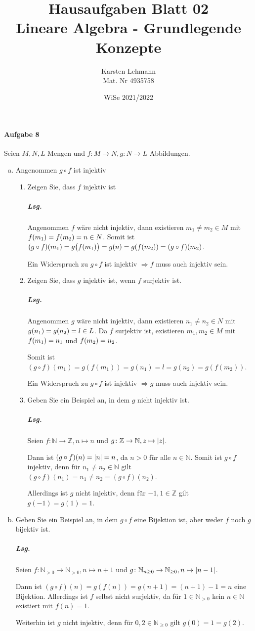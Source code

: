 \documentclass{scrreprt}
\author{Karsten Lehmann\\Mat. Nr 4935758}
\date{WiSe 2021/2022}
\title{Hausaufgaben Blatt 02\\Lineare Algebra - Grundlegende Konzepte}
\begin{document}
\paragraph{Aufgabe 8} Seien $M, N, L$ Mengen und
$f \colon M \to N, g \colon N \to L$ Abbildungen.
\begin{enumerate}[(a)]
\item Angenommen $g \circ f$ ist injektiv
  \begin{enumerate}[label={(a\arabic*)}]
  \item Zeigen Sie, dass $f$ injektiv ist

    \subparagraph{Lsg.} Angenommen $f$ wäre nicht injektiv,
    dann existieren $m_1 \ne m_2 \in M$ mit $f\qty(m_1) = f\qty(m_2) = n \in N$.
    Somit ist
    $(g \circ f)\qty(m_1) = g\qty\big(f(m_1)) = g(n) = g\qty(f(m_2))
    = (g \circ f)(m_2)$.

    Ein Widerspruch zu $g \circ f$ ist injektiv $\Rightarrow f$ muss auch injektiv sein.
  \item Zeigen Sie, dass $g$ injektiv ist, wenn $f$ surjektiv ist.

    \subparagraph{Lsg.} Angenommen $g$ wäre nicht injektiv,
    dann existieren $n_1 \ne n_2 \in N$ mit $g\qty(n_1) = g\qty(n_2) = l \in L$.
    Da $f$ surjektiv ist, existieren $m_1, m_2 \in M$ mit $f\qty(m_1) = n_1$
    und $f\qty(m_2) = n_2$.

    Somit ist
    $(g \circ f)(m_1) = g(f(m_1)) = g(n_1) = l = g(n_2) = g(f(m_2))$.

    Ein Widerspruch zu $g \circ f$ ist injektiv $\Rightarrow g$ muss auch injektiv sein.

  \item Geben Sie ein Beispiel an, in dem $g$ nicht injektiv ist.

    \subparagraph{Lsg.} Seien $f \colon \mathbb{N} \to \mathbb{Z}, n \mapsto n$
    und $g \colon \mathbb{Z} \to \mathbb{N}, z \mapsto \abs{z}$.

    Dann ist $(g \circ f)(n) = \abs{n} = n$, da $n > 0$ für alle $n \in \mathbb{N}$.
    Somit ist $g \circ f$ injektiv, denn für $n_1 \ne n_2 \in \mathbb{N}$ gilt
    $(g \circ f)(n_1) = n_1 \ne n_2 = (g \circ f)(n_2)$.

    Allerdings ist $g$ nicht injektiv, denn für $-1, 1 \in \mathbb{Z}$ gilt
    $g(-1) = g(1) = 1$.
  \end{enumerate}

\setcounter{enumi}{2}
\item Geben Sie ein Beispiel an, in dem $g \circ f$ eine Bijektion ist, aber
  weder $f$ noch $g$ bijektiv ist.

  \subparagraph{Lsg.} Seien $f \colon \mathbb{N}_{> 0} \to \mathbb{N}_{> 0},
  n \mapsto n + 1$ und $g \colon \mathbb{N}_{n \geq 0} \to \mathbb{N}_{\geq 0},
  n \mapsto \abs{n - 1}$.

  Dann ist $(g \circ f)(n) = g(f(n)) = g(n + 1) = (n + 1) - 1 = n$ eine
  Bijektion.
  Allerdings ist $f$ selbst nicht surjektiv, da für $1 \in \mathbb{N}_{> 0}$ kein
  $n \in \mathbb{N}$ existiert mit $f(n) = 1$.

  Weiterhin ist $g$ nicht injektiv, denn für $0, 2 \in \mathbb{N}_{\geq 0}$
  gilt $g(0) = 1 = g(2)$.
\end{enumerate}
\end{document}
